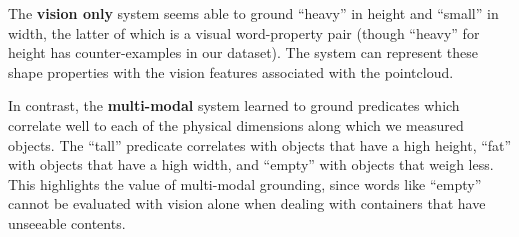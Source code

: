 The \textbf{vision only} system seems able to ground ``heavy'' in height and ``small'' in width, the latter of which is a visual word-property pair (though ``heavy'' for height has counter-examples in our dataset).
The system can represent these shape properties with the vision features associated with the pointcloud.

In contrast, the \textbf{multi-modal} system learned to ground predicates which correlate well to each of the physical dimensions along which we measured objects.
The ``tall'' predicate correlates with objects that have a high height, ``fat'' with objects that have a high width, and ``empty'' with objects that weigh less.
This highlights the value of multi-modal grounding, since words like ``empty'' cannot be evaluated with vision alone when dealing with containers that have unseeable contents.